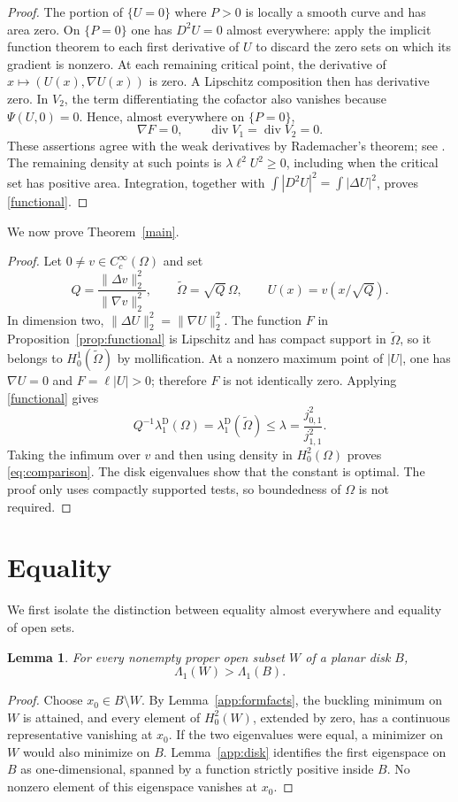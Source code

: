\documentclass[11pt,letterpaper,reqno]{amsart}
\newtheorem{lemma}[theorem]{Lemma}
\theoremstyle{definition}
\begin{document}
\begin{proof}
The portion of $\{U=0\}$ where $P>0$ is locally a smooth curve and
has area zero. On $\{P=0\}$ one has $D^2U=0$ almost everywhere:
apply the implicit function theorem to each first derivative of
$U$ to discard the zero sets on which its gradient is nonzero.
At each remaining critical point, the derivative of
$x\mapsto(U(x),\nabla U(x))$ is zero. A Lipschitz composition then
has derivative zero. In $V_2$, the term differentiating the cofactor
also vanishes because $\Psi(U,0)=0$. Hence, almost everywhere on
$\{P=0\}$,
\[
 \nabla F=0,\qquad \operatorname{div}V_1
       =\operatorname{div}V_2=0.
\]
These assertions agree with the weak derivatives by Rademacher's
theorem; see \cite[\S\S3.1, 4.2]{EG}. The remaining density at
such points is $\lambda\ell^2U^2\ge0$, including when the critical
set has positive area. Integration, together with
$\int|D^2U|^2=\int|\Delta U|^2$, proves \eqref{functional}.
\end{proof}

We now prove Theorem~\ref{main}.
\begin{proof}
Let $0\ne v\in C_c^\infty(\Omega)$ and set
\[
 Q=\frac{\|\Delta v\|_2^2}{\|\nabla v\|_2^2},\qquad
 \widetilde\Omega=\sqrt Q\,\Omega,\qquad U(x)=v(x/\sqrt Q).
\]
In dimension two, $\|\Delta U\|_2^2=\|\nabla U\|_2^2$.
The function $F$ in Proposition~\ref{prop:functional} is Lipschitz
and has compact support in $\widetilde\Omega$, so it belongs to
$H_0^1(\widetilde\Omega)$ by mollification. At a nonzero maximum
point of $|U|$, one has $\nabla U=0$ and $F=\ell|U|>0$; therefore
$F$ is not identically zero. Applying \eqref{functional} gives
\[
 Q^{-1}\lambda_1^{\mathrm D}(\Omega)
   =\lambda_1^{\mathrm D}(\widetilde\Omega)
   \le\lambda=\frac{j_{0,1}^2}{j_{1,1}^2}.
\]
Taking the infimum over $v$ and then using density in $H_0^2(\Omega)$
proves \eqref{eq:comparison}. The disk eigenvalues show that the
constant is optimal. The proof only uses compactly supported tests,
so boundedness of $\Omega$ is not required.
\end{proof}

\section{Equality}\label{sec:equality}
We first isolate the distinction between equality almost everywhere
and equality of open sets.
\begin{lemma}\label{lem:strict-disk}
For every nonempty proper open subset $W$ of a planar disk $B$,
\[
 \Lambda_1(W)>\Lambda_1(B).
\]
\end{lemma}
\begin{proof}
Choose $x_0\in B\setminus W$. By Lemma~\ref{app:formfacts}, the
buckling minimum on $W$ is attained, and every element of $H_0^2(W)$,
extended by zero, has a continuous representative vanishing at $x_0$.
If the two eigenvalues were equal, a minimizer on $W$ would also
minimize on $B$. Lemma~\ref{app:disk} identifies the first eigenspace
on $B$ as one-dimensional, spanned by a function strictly positive
inside $B$. No nonzero element of this eigenspace vanishes at $x_0$.
\end{proof}
\end{document}
